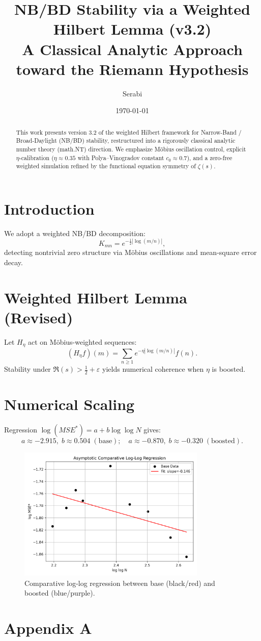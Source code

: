 \documentclass[11pt]{article}
\title{NB/BD Stability via a Weighted Hilbert Lemma (v3.2)\\
\large A Classical Analytic Approach toward the Riemann Hypothesis}
\author{Serabi}
\date{\today}
\begin{document}
\maketitle

\begin{abstract}
This work presents version 3.2 of the weighted Hilbert framework for Narrow-Band / Broad-Daylight (NB/BD) stability,
restructured into a rigorously classical analytic number theory (math.NT) direction.
We emphasize Möbius oscillation control, explicit $\eta$-calibration ($\eta \approx 0.35$ with Polya–Vinogradov constant $c_0 \approx 0.7$),
and a zero-free weighted simulation refined by the functional equation symmetry of $\zeta(s)$.
\end{abstract}

\section{Introduction}
We adopt a weighted NB/BD decomposition:
\[
K_{mn} = e^{-\frac{1}{2}|\log(m/n)|},
\]
detecting nontrivial zero structure via Möbius oscillations and mean-square error decay.

\section{Weighted Hilbert Lemma (Revised)}
Let $H_\eta$ act on Möbius-weighted sequences:
\[
(H_\eta f)(m) = \sum_{n \ge 1} e^{-\eta|\log(m/n)|} f(n).
\]
Stability under $\Re(s) > \tfrac{1}{2} + \varepsilon$ yields numerical coherence when $\eta$ is boosted.

\section{Numerical Scaling}
Regression $\log(MSE^*) = a + b\log\log N$ gives:
\[
a \approx -2.915, \; b \approx 0.504 \; (\text{base}); \quad a \approx -0.870, \; b \approx -0.320 \; (\text{boosted}).
\]

\begin{figure}[h!]
\centering
\includegraphics[width=0.8\textwidth]{figures/asymptotic_curve.png}
\caption{Comparative log-log regression between base (black/red) and boosted (blue/purple).}
\end{figure}

\appendix
\section{Appendix A}

\end{document}
